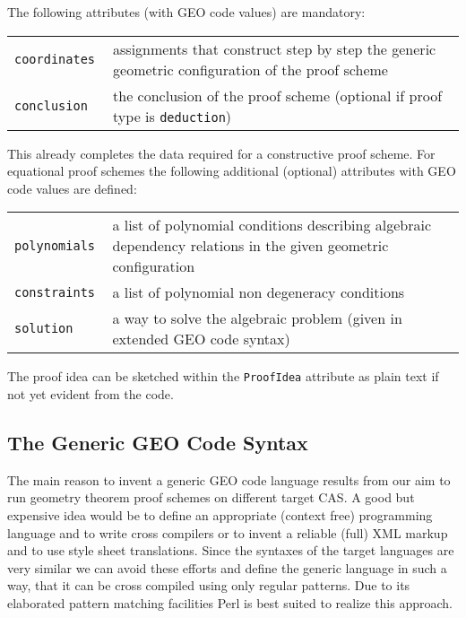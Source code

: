 \documentclass[11pt]{article}
\begin{document}
The following attributes (with GEO code values) are mandatory:
\begin{center}
\begin{tabular}{lp{9cm}}
\tt coordinates & assignments that construct step by step the
generic geometric configuration of the proof scheme\\
\tt conclusion & the conclusion of the proof scheme (optional if
proof type is {\tt deduction})\\
\end{tabular}
\end{center}
This already completes the data required for a constructive proof
scheme.  For equational proof schemes the following additional
(optional) attributes with GEO code values are defined:
\begin{center}
\begin{tabular}{lp{9cm}}
\tt polynomials & a list of polynomial conditions describing
algebraic dependency relations in the given geometric
configuration\\
\tt constraints & a list of polynomial non degeneracy
conditions\\ 
\tt solution & a way to solve the algebraic problem (given in
extended GEO code syntax)
\end{tabular}
\end{center}
The proof idea can be sketched within the {\tt ProofIdea} attribute as
plain text if not yet evident from the code.

\subsection{The Generic GEO Code Syntax}

The main reason to invent a generic GEO code language results
from our aim to run geometry theorem proof schemes on different
target CAS. A good but expensive idea would be to define an
appropriate (context free) programming language and to write
cross compilers or to invent a reliable (full) XML markup and to
use style sheet translations.  Since the syntaxes of the target
languages are very similar we can avoid these efforts and define
the generic language in such a way, that it can be cross compiled
using only regular patterns.  Due to its elaborated pattern
matching facilities Perl is best suited to realize this approach.
\medskip
\end{document}
